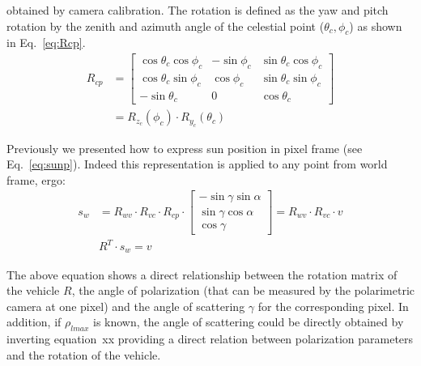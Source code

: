obtained by camera calibration. The rotation is
defined as the yaw and pitch rotation by the zenith and azimuth angle of the
celestial point ($\theta_c, \phi_c$) as shown in Eq.~\ref{eq:Rcp}.
\begin{equation}
  \label{eq:Rcp}
  \begin{split}
  R_{cp}  & =
  \begin{bmatrix}
    \cos\theta_{c}\cos\phi_{c} & -\sin\phi_{c} & \sin\theta_{c}\cos\phi_{c}\\
    \cos\theta_{c}\sin\phi_{c} & \cos\phi_{c} & \sin\theta_{c}\sin\phi_{c}\\
    -\sin\theta_{c} & 0 & \cos\theta_{c}
  \end{bmatrix}
  \\
  & = R_{z_{c}}(\phi_{c})\cdot R_{y_{c}}(\theta_{c})
  \end{split}
\end{equation}

Previously we presented how to express sun position in pixel frame (see
Eq.~\ref{eq:sunp}). Indeed this representation is applied to any point from
world frame, ergo:
\begin{equation}
  \label{eq:Rwv}
  \begin{split}
    s_{w} & = R_{wv} \cdot R_{vc} \cdot R_{cp} \cdot
    \begin{bmatrix}
    -\sin\gamma \sin\alpha\\
    \sin\gamma \cos\alpha\\
    \cos\gamma
  \end{bmatrix} = R_{wv} \cdot R_{vc} \cdot v\\
    & R^{T} \cdot s_{w}  = v
  \end{split}
\end{equation}

The above equation shows a direct relationship between the rotation matrix of the vehicle $R$, 
the angle of polarization (that can be measured by the polarimetric camera at one pixel) and the 
angle of scattering $\gamma$ for the corresponding pixel. In addition, if $\rho_{lmax}$ is known,
the angle of scattering could be directly obtained by inverting equation~xx providing a direct relation
between polarization parameters and the rotation of the vehicle.

